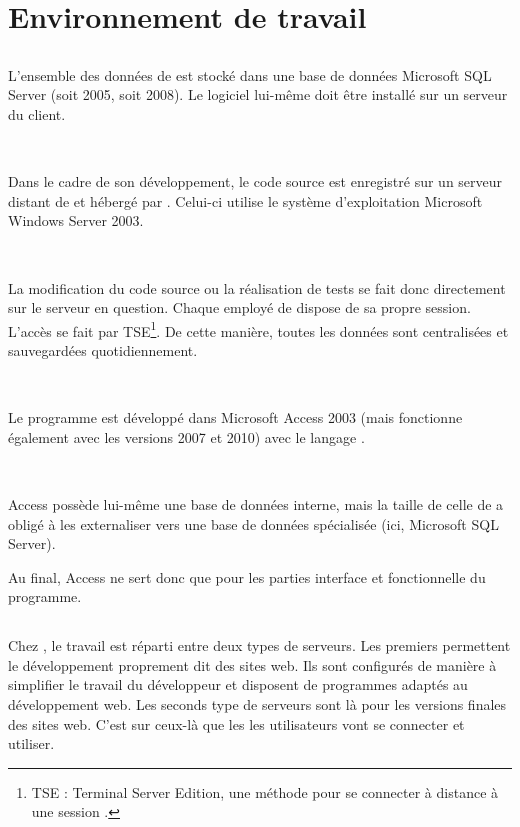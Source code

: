\chapter{Environnement de travail}
\section{\solulog}
L'ensemble des données de \integrale{} est stocké dans une base de données Microsoft SQL Server (soit 2005, soit 2008). Le logiciel lui-même doit être installé sur un serveur du client.

~

Dans le cadre de son développement, le code source est enregistré sur un serveur distant de \solulog{} et hébergé par \fidit. Celui-ci utilise le système d'exploitation Microsoft Windows Server 2003.

~

La modification du code source ou la réalisation de tests se fait donc directement sur le serveur en question. Chaque employé de \solulog{} dispose de sa propre session. L'accès se fait par TSE\footnote{TSE : Terminal Server Edition, une méthode pour se connecter à distance à une session .}. De cette manière, toutes les données sont centralisées et sauvegardées quotidiennement.

~

Le programme \integrale{} est développé dans Microsoft Access 2003 (mais fonctionne également avec les versions 2007 et 2010) avec le langage \vb.

~

Access possède lui-même une base de données interne, mais la taille de celle de \integrale{} a obligé \solulog{} à les externaliser vers une base de données spécialisée (ici, Microsoft SQL Server).

Au final, Access ne sert donc que pour les parties interface et fonctionnelle du programme.

\section{\fidit}
Chez \fidit, le travail est réparti entre deux types de serveurs. Les premiers permettent le développement proprement dit des sites web. Ils sont configurés de manière à simplifier le travail du développeur et disposent de programmes adaptés au développement web.
Les seconds type de serveurs sont là pour les versions finales des sites web. C'est sur ceux-là que les les utilisateurs vont se connecter et utiliser.

